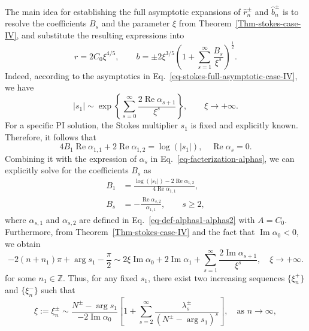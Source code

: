 \documentclass[12pt]{article}
\theoremstyle{plain}
\theoremstyle{definition}
\numberwithin{equation}{section}
\renewcommand\Re{\operatorname{Re}}
\renewcommand\Im{\operatorname{Im}}
\begin{document}
The main idea for establishing the full asymptotic expansions of \( \hat{r}_{n}^{\pm} \) and \( \hat{b}_{n}^{\pm} \) is to resolve the coefficients \( B_{s} \) and the parameter \( \xi \) from Theorem~\ref{Thm-stokes-case-IV}, and substitute the resulting expressions into
\begin{equation}
r = 2C_{0}\xi^{4/5}, \qquad b = \pm 2\xi^{3/5} \left(1 + \sum_{s=1}^{\infty} \frac{B_{s}}{\xi^{s}} \right)^{\frac{1}{2}}.
\end{equation}
Indeed, according to the asymptotics in Eq.~\eqref{eq-stokes-full-asymptotic-case-IV}, we have
\begin{equation}
|s_{1}|\sim \exp\left\{\sum\limits_{s=0}^{\infty}\frac{2\Re\alpha_{s+1}}{\xi^{s}}\right\},\qquad \xi\to+\infty.
\end{equation}
For a specific PI solution, the Stokes multiplier \( s_{1} \) is fixed and explicitly known. Therefore, it follows that
\begin{equation}
4B_{1}\Re\alpha_{1,1}+2\Re\alpha_{1,2}=\log\left(|s_{1}|\right),\quad \Re\alpha_{s}=0.
\end{equation}
Combining it with the expression of $\alpha_{s}$  in Eq.~\eqref{eq-facterization-alphas}, we can explicitly solve for the coefficients \( B_{s} \) as
\begin{equation}\label{eq-solve-Bs-by-s1}
\begin{split}
B_{1}&=\frac{\log\left(|s_{1}|\right)-2\Re\alpha_{1,2}}{4\Re\alpha_{1,1}},\\
B_{s}&=-\frac{\Re\alpha_{s,2}}{\alpha_{1,1}}, \qquad s\geq 2,
\end{split}
\end{equation}
where \( \alpha_{s,1} \) and \( \alpha_{s,2} \) are defined in Eq.~\eqref{eq-def-alphas1-alphas2} with \( A = C_{0} \).
Furthermore, from Theorem~\ref{Thm-stokes-case-IV} and the fact that \( \Im \alpha_{0} < 0 \), we obtain
\begin{equation}
-2(n+n_{1})\pi+\arg{s_{1}}-\frac{\pi}{2}\sim 2\xi\Im\alpha_{0}+2\Im\alpha_{1}+\sum\limits_{s=1}^{\infty}\frac{2\Im\alpha_{s+1}}{\xi^{s}},\quad \xi\to+\infty.
\end{equation}
for some \( n_{1} \in \mathbb{Z} \). Thus, for any fixed \( s_{1} \), there exist two increasing sequences \( \{ \xi_{n}^{+} \} \) and \( \{ \xi_{n}^{-} \} \) such that
\begin{equation}\label{eq-full-asym-expan-xin-by-s1}
\xi:=\xi_{n}^{\pm}\sim \frac{N^{\pm}-\arg{s_1}}{-2\Im\alpha_{0}}\left[1+\sum\limits_{s=2}^{\infty}\frac{\lambda_{s}^{\pm}}{(N^{\pm}-\arg{s_1})^{s}}\right], \quad\text{as } n\to\infty,
\end{equation}
\end{document}
